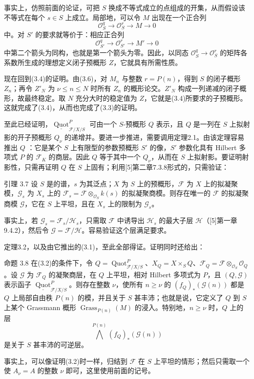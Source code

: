 事实上，仿照前面的论证，可把 $S$ 换成不等式成立的点组成的开集，从而假设该不等式在每个 $s\in S$ 上成立。局部地，可以令 $M$ 出现在一个正合列
\[
\mathcal O_S^q\longrightarrow\mathcal O_S^r\longrightarrow M\longrightarrow0
\]
中。对 $S'$ 的要求就等价于：相应正合列
\[
\mathcal O_{S'}^q\longrightarrow\mathcal O_{S'}^r\longrightarrow M'\longrightarrow0
\]
中第二个箭头为同构，也就是第一个箭头为零。因此，以同态 $\mathcal O_S^q\to\mathcal O_S^r$ 的矩阵各系数所生成的理想定义闭子预概形 $Z$，它就具有所需性质。

现在回到(3.4)的证明。由(3.6)，对 $M_n$ 与整数 $r=P(n)$，得到 $S$ 的闭子概形 $Z_n$；再令 $Z'_N$ 为 $\nu\leq n\leq N$ 时所有 $Z_n$ 的概形论交。$Z'_N$ 构成一列递减的闭子概形，故最终稳定。取 $N$ 充分大时的稳定值为 $Z$，它就是(3.4)所要求的子预概形。这就完成了(3.4)，从而也完成了(3.3)的证明。

至此已经证明，$\underline{\operatorname{Quot}}^P_{\mathcal F/X/S}$ 可由一个 $S$-预概形 $Q$ 表示，且 $Q$ 是一列在 $S$ 上拟射影的开子预概形 $Q_\nu$ 的递增并。要进一步推进，需要调用定理2.1。由该定理容易推出 $Q$ ：它是某个 $S$ 上有限型的参数预概形 $S'$ 的像，$S'$ 参数化具有 Hilbert 多项式 $P$ 的 $\mathcal F_K$ 的商层。因此 $Q$ 等于其中一个 $Q_\nu$，从而在 $S$ 上拟射影。要证明射影性，只需再证明 $Q$ 在 $S$ 上固有；利用[5]第二章7.3.8形式的，只需验证：

\begin{statement}{引理 3.7}
设 $S$ 是的谱，$s$ 为其泛点；$X$ 为 $S$ 上的预概形，$\mathcal F$ 为 $X$ 上的拟凝聚模，$\mathcal G_s$ 为 $X_s$ 上的 $\mathcal F_s=\mathcal F\otimes_{\mathcal O_S}k(s)$ 的拟凝聚商模。则存在唯一的 $\mathcal F$ 的拟凝聚商模 $\mathcal G$，它在 $S$ 上平坦，且在 $X_s$ 上的限制为 $\mathcal G_s$。
\end{statement}

事实上，若 $\mathcal G_s=\mathcal F_s/\mathcal H_s$，只需取 $\mathcal F$ 中诱导出 $\mathcal H_s$ 的最大子层 $\mathcal H$（[5]第一章9.4.2），然后令 $\mathcal G=\mathcal F/\mathcal H$。容易验证这个层满足要求。

定理3.2，以及由它推出的(3.1)，至此全部得证。证明同时还给出：

\begin{statement}{命题 3.8}
在(3.2)的条件下，令 $Q=\operatorname{Quot}^P_{\mathcal F/X/S}$、$X_Q=X\times_SQ$、$\mathcal F_Q=\mathcal F\otimes_{\mathcal O_S}\mathcal O_Q$。设 $\mathcal G$ 为 $\mathcal F_Q$ 的凝聚商层，在 $Q$ 上平坦，相对 Hilbert 多项式为 $P$，且 $(Q,\mathcal G)$ 表示函子 $\underline{\operatorname{Quot}}^P_{\mathcal F/X/S}$。则存在整数 $\nu$，使所有 $n\geq\nu$ 的 $(f_Q)_*(\mathcal G(n))$ 都是 $Q$ 上局部自由秩 $P(n)$ 的模，并且关于 $S$ 甚丰沛；也就是说，它定义了 $Q$ 到 $S$ 上某个 Grassmann 概形 $\operatorname{Grass}_{P(n)}(M)$ 的浸入。特别地，$n\geq\nu$ 时，$Q$ 上的层
\[
\bigwedge^{P(n)}(f_Q)_*(\mathcal G(n))
\]
是关于 $S$ 甚丰沛的可逆层。
\end{statement}
事实上，可以像证明(3.2)时一样，归结到 $\mathcal F$ 在 $S$ 上平坦的情形；然后只需取一个使 $A_\nu=A$ 的整数 $\nu$ 即可，这里使用前面的记号。

